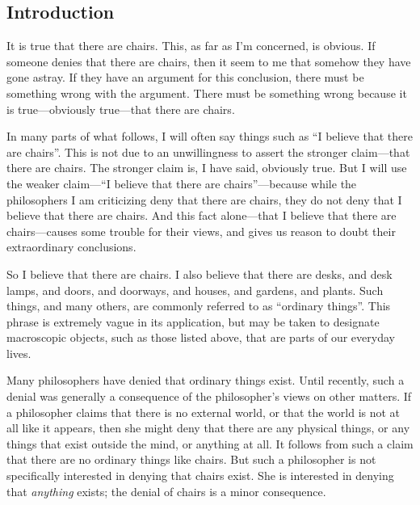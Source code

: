 \documentclass[12pt,twoside]{reedfancy}
\begin{document}
\begin{spacing}{1.25}
\mainmatter %
\pagestyle{fancyplain} %

\fancyhead[CE]{\textit{\thetitle}}%
\fancyhead[CO]{\textit{\thetitle}}
\renewcommand{\headrulewidth}{0.0pt}

\chapter*{Introduction}
It is true that there are chairs.  This, as far as I'm concerned, is
obvious.  If someone denies that there are chairs, then it seem to me
that somehow they have gone astray.  If they have an argument for this
conclusion, there must be something wrong with the argument.  There
must be something wrong because it is true---obviously true---that
there are chairs.

In many parts of what follows, I will often say things such as ``I
believe that there are chairs''.  This is not due to an unwillingness
to assert the stronger claim---that there are chairs.  The stronger
claim is, I have said, obviously true.  But I will use the weaker
claim---``I believe that there are chairs''---because while the
philosophers I am criticizing deny that there are chairs, they do not
deny that I believe that there are chairs.  And this fact alone---that
I believe that there are chairs---causes some trouble for their views,
and gives us reason to doubt their extraordinary conclusions.

So I believe that there are chairs.  I also believe that there are
desks, and desk lamps, and doors, and doorways, and houses, and
gardens, and plants.  Such things, and many others, are commonly
referred to as ``ordinary things''.  This phrase is extremely vague in
its application, but may be taken to designate macroscopic objects,
such as those listed above, that are parts of our everyday lives.

Many philosophers have denied that ordinary things exist.  Until
recently, such a denial was generally a consequence of the
philosopher's views on other matters.  If a philosopher claims that
there is no external world, or that the world is not at all like it
appears, then she might deny that there are any physical things, or
any things that exist outside the mind, or anything at all.  It
follows from such a claim that there are no ordinary things like
chairs.  But such a philosopher is not specifically interested in
denying that chairs exist.  She is interested in denying that {\em
  anything} exists; the denial of chairs is a minor consequence.


\end{spacing}
\end{document}
